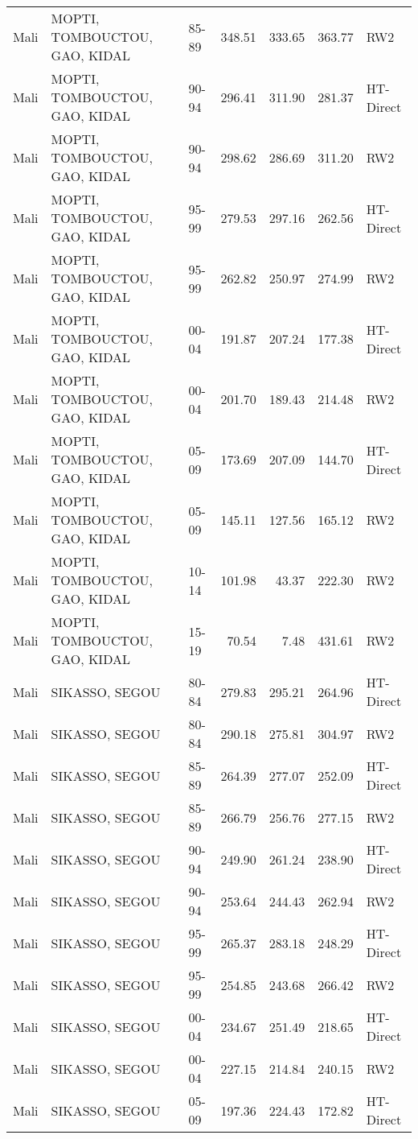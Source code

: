 \begin{longtable}{lllrrrl}
  Mali & MOPTI, TOMBOUCTOU, GAO, KIDAL & 85-89 & 348.51 & 333.65 & 363.77 & RW2 \\ 
  Mali & MOPTI, TOMBOUCTOU, GAO, KIDAL & 90-94 & 296.41 & 311.90 & 281.37 & HT-Direct \\ 
  Mali & MOPTI, TOMBOUCTOU, GAO, KIDAL & 90-94 & 298.62 & 286.69 & 311.20 & RW2 \\ 
  Mali & MOPTI, TOMBOUCTOU, GAO, KIDAL & 95-99 & 279.53 & 297.16 & 262.56 & HT-Direct \\ 
  Mali & MOPTI, TOMBOUCTOU, GAO, KIDAL & 95-99 & 262.82 & 250.97 & 274.99 & RW2 \\ 
  Mali & MOPTI, TOMBOUCTOU, GAO, KIDAL & 00-04 & 191.87 & 207.24 & 177.38 & HT-Direct \\ 
  Mali & MOPTI, TOMBOUCTOU, GAO, KIDAL & 00-04 & 201.70 & 189.43 & 214.48 & RW2 \\ 
  Mali & MOPTI, TOMBOUCTOU, GAO, KIDAL & 05-09 & 173.69 & 207.09 & 144.70 & HT-Direct \\ 
  Mali & MOPTI, TOMBOUCTOU, GAO, KIDAL & 05-09 & 145.11 & 127.56 & 165.12 & RW2 \\ 
  Mali & MOPTI, TOMBOUCTOU, GAO, KIDAL & 10-14 & 101.98 & 43.37 & 222.30 & RW2 \\ 
  Mali & MOPTI, TOMBOUCTOU, GAO, KIDAL & 15-19 & 70.54 & 7.48 & 431.61 & RW2 \\ 
  Mali & SIKASSO, SEGOU & 80-84 & 279.83 & 295.21 & 264.96 & HT-Direct \\ 
  Mali & SIKASSO, SEGOU & 80-84 & 290.18 & 275.81 & 304.97 & RW2 \\ 
  Mali & SIKASSO, SEGOU & 85-89 & 264.39 & 277.07 & 252.09 & HT-Direct \\ 
  Mali & SIKASSO, SEGOU & 85-89 & 266.79 & 256.76 & 277.15 & RW2 \\ 
  Mali & SIKASSO, SEGOU & 90-94 & 249.90 & 261.24 & 238.90 & HT-Direct \\ 
  Mali & SIKASSO, SEGOU & 90-94 & 253.64 & 244.43 & 262.94 & RW2 \\ 
  Mali & SIKASSO, SEGOU & 95-99 & 265.37 & 283.18 & 248.29 & HT-Direct \\ 
  Mali & SIKASSO, SEGOU & 95-99 & 254.85 & 243.68 & 266.42 & RW2 \\ 
  Mali & SIKASSO, SEGOU & 00-04 & 234.67 & 251.49 & 218.65 & HT-Direct \\ 
  Mali & SIKASSO, SEGOU & 00-04 & 227.15 & 214.84 & 240.15 & RW2 \\ 
  Mali & SIKASSO, SEGOU & 05-09 & 197.36 & 224.43 & 172.82 & HT-Direct \\ 

\end{longtable}
